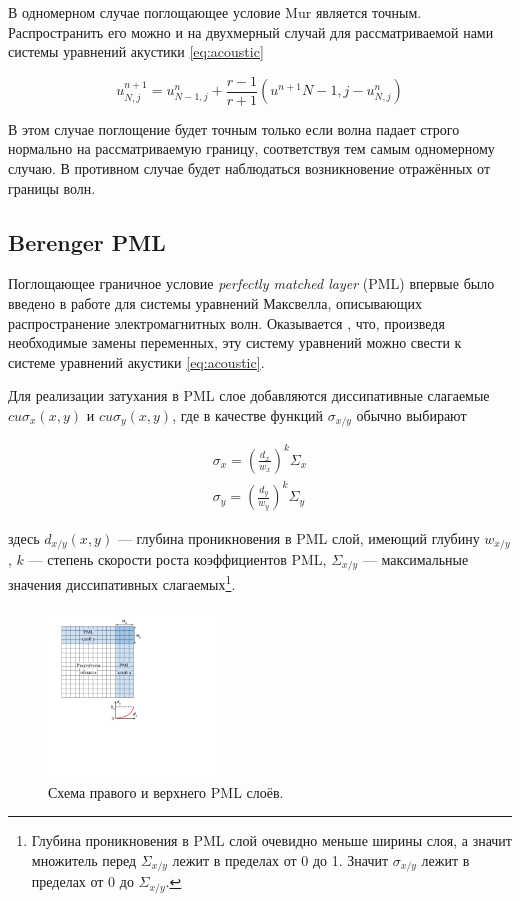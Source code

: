 В одномерном случае поглощающее условие Mur является точным. Распространить его можно и на двухмерный случай для рассматриваемой нами системы уравнений акустики \eqref{eq:acoustic}

\begin{equation}
    u^{n+1}_{N,j} = u^n_{N-1,j} + \dfrac{r-1}{r+1}(u^{n+1}{N-1,j}-u^n_{N,j})
\end{equation}

В этом случае поглощение будет точным только если волна падает строго нормально на рассматриваемую границу, соответствуя тем самым одномерному случаю. В противном случае будет наблюдаться  возникновение отражённых от границы волн.

\subsection{Berenger PML}

Поглощающее граничное условие \textit{perfectly matched layer} (PML) впервые было введено в работе \cite{berenger} для системы уравнений Максвелла, описывающих распространение электромагнитных волн. Оказывается \cite{pml_from_maxwell}, что, произведя необходимые замены переменных, эту систему уравнений можно свести к системе уравнений акустики \eqref{eq:acoustic}.

Для реализации затухания в PML слое добавляются диссипативные слагаемые $c u \sigma_x(x,y)$ и $c u \sigma_y(x,y)$, где в качестве функций $\sigma_{x/y}$ обычно выбирают

\begin{gather}
	\sigma_x = \left(\frac{d_x}{w_{x}}\right)^k \Sigma_{x}\\
	\sigma_y = \left(\frac{d_y}{w_{y}}\right)^k \Sigma_{y}
\end{gather}
    
здесь $d_{x/y}(x,y)$ --- глубина проникновения в PML слой, имеющий глубину $w_{x/y}$, $k$ --- степень скорости роста коэффициентов PML, $\Sigma_{x/y}$ --- максимальные значения диссипативных слагаемых\footnote{Глубина проникновения в PML слой очевидно меньше ширины слоя, а значит множитель перед $\Sigma_{x/y}$ лежит в пределах от 0 до 1. Значит $\sigma_{x/y}$ лежит в пределах от 0 до $\Sigma_{x/y}$.}. 

\begin{figure}[htp]
    \centering
    \includegraphics[trim={72pt 325pt 430pt 55pt},clip,width=0.4\textwidth]{images/pml/pml_scheme.png}
    \caption{Схема правого и верхнего PML слоёв.}
    \label{fig:pml_scheme}
\end{figure}

